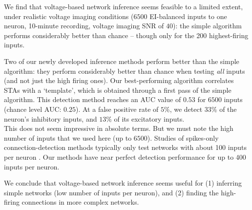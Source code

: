 We find that voltage-based network inference seems feasible to a limited extent, under realistic voltage imaging conditions ($6500$ EI-balanced inputs to one neuron, 10-minute
recording, voltage imaging SNR of $40$): the simple algorithm performs considerably better than chance -- though only for the 200 highest-firing inputs.

Two of our newly developed inference methods perform better than the simple algorithm: they perform considerably better than chance when testing \emph{all} inputs (and not just the high firing ones). Our best-performing algorithm correlates STAs with a `template', which is obtained through a first pass of the simple algorithm. This detection method reaches an AUC value of $0.53$ for $6500$ inputs (chance level AUC: $0.25$). At a false positive rate of $5$\%, we detect $33$\% of the neuron's inhibitory inputs, and $13$\% of its excitatory inputs.\\
This does not seem impressive in absolute terms. But we must note the high number of inputs that we used here (up to $6500$). Studies of spikes-only connection-detection methods typically only test networks with about 100 inputs per neuron \cite{Ito2011ExtendingTransferEntropy,Guyon2014DesignFirstNeuronal}.
Our methods have near perfect detection performance for up to 400 inputs per neuron.

We conclude that voltage-based network inference seems useful for (1) inferring simple networks (low number of inputs per neuron), and (2) finding the high-firing connections in more complex networks.
